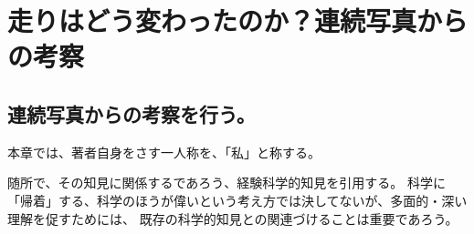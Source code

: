 \chapter{走りはどう変わったのか？連続写真からの考察}

\section{連続写真からの考察を行う。}
本章では、著者自身をさす一人称を、「私」と称する。

随所で、その知見に関係するであろう、経験科学的知見を引用する。
科学に「帰着」する、科学のほうが偉いという考え方では決してないが、多面的・深い理解を促すためには、
既存の科学的知見との関連づけることは重要であろう。